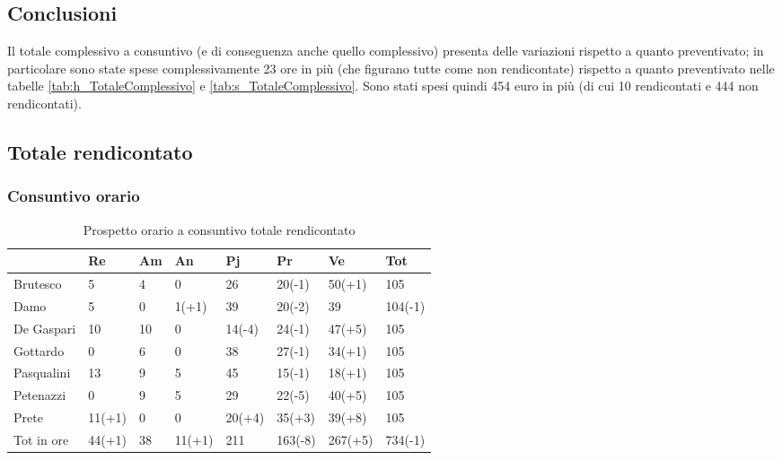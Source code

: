 						\subsection{Conclusioni}
						Il totale complessivo a consuntivo (e di conseguenza anche quello complessivo) presenta delle variazioni rispetto a quanto preventivato; in particolare sono state spese complessivamente 23 ore in più (che figurano tutte come non rendicontate) rispetto a quanto preventivato nelle tabelle  \ref{tab:h_TotaleComplessivo} e  \ref{tab:s_TotaleComplessivo}.
						Sono stati spesi quindi 454 euro in più (di cui 10 rendicontati e 444 non rendicontati).
	
	\newpage
	\subsection{Totale rendicontato}
		\subsubsection{Consuntivo orario}
		
		\begin{table}[h] \begin{center} \begin{tabular}{llllllll}																					
					\toprule																					
					&	Re		&	Am		&	An		&	Pj		&	Pr		&	Ve		&	Tot	\\
					\midrule													Brutesco	&	5		&	4		&	0		&	26		&	20(-1)		&	50(+1)		&	105	\\
					Damo	&	5		&	0		&	1(+1)		&	39		&	20(-2)		&	39		&	104(-1)	\\
					De Gaspari	&	10		&	10		&	0		&	14(-4)		&	24(-1)		&	47(+5)		&	105	\\
					Gottardo	&	0		&	6		&	0		&	38		&	27(-1)		&	34(+1)		&	105	\\
					Pasqualini	&	13		&	9		&	5		&	45		&	15(-1)		&	18(+1)		&	105	\\
					Petenazzi	&	0		&	9		&	5		&	29		&	22(-5)		&	40(+5)		&	105	\\
					Prete	&	11(+1)		&	0		&	0		&	20(+4)		&	35(+3)		&	39(+8)		&	105	\\
					\midrule																					
					Tot in ore	&	44(+1)		&	38		&	11(+1)		&	211		&	163(-8)		&	267(+5)		&	734(-1)	\\
																						
																				
				\end{tabular} \end{center} \caption{Prospetto orario a consuntivo totale rendicontato											
			} \end{table}
